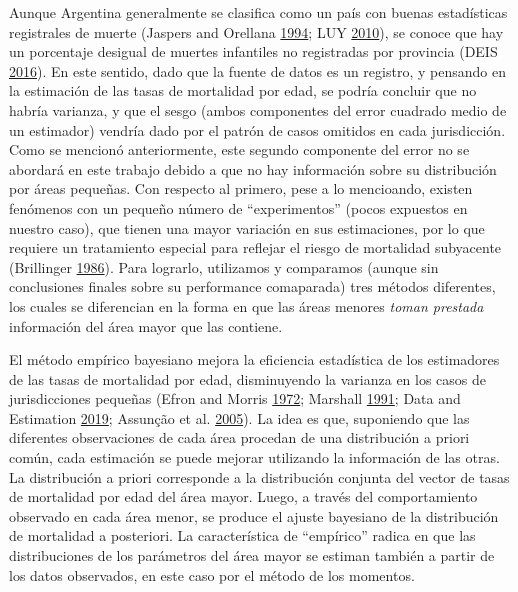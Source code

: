 \documentclass[12pt,]{article}
\begin{document}
Aunque Argentina generalmente se clasifica como un país con buenas
estadísticas registrales de muerte (Jaspers and Orellana
\protect\hyperlink{ref-JaspersOrellana1994}{1994}; LUY
\protect\hyperlink{ref-Luy2010}{2010}), se conoce que hay un porcentaje
desigual de muertes infantiles no registradas por provincia (DEIS
\protect\hyperlink{ref-DEIS2016}{2016}). En este sentido, dado que la
fuente de datos es un registro, y pensando en la estimación de las tasas
de mortalidad por edad, se podría concluir que no habría varianza, y que
el sesgo (ambos componentes del error cuadrado medio de un estimador)
vendría dado por el patrón de casos omitidos en cada jurisdicción. Como
se mencionó anteriormente, este segundo componente del error no se
abordará en este trabajo debido a que no hay información sobre su
distribución por áreas pequeñas. Con respecto al primero, pese a lo
mencioando, existen fenómenos con un pequeño número de ``experimentos''
(pocos expuestos en nuestro caso), que tienen una mayor variación en sus
estimaciones, por lo que requiere un tratamiento especial para reflejar
el riesgo de mortalidad subyacente (Brillinger
\protect\hyperlink{ref-Brillinger1986}{1986}). Para lograrlo, utilizamos
y comparamos (aunque sin conclusiones finales sobre su performance
comaparada) tres métodos diferentes, los cuales se diferencian en la
forma en que las áreas menores \emph{toman prestada} información del
área mayor que las contiene.

El método empírico bayesiano mejora la eficiencia estadística de los
estimadores de las tasas de mortalidad por edad, disminuyendo la
varianza en los casos de jurisdicciones pequeñas (Efron and Morris
\protect\hyperlink{ref-Efron1972}{1972}; Marshall
\protect\hyperlink{ref-Marshall1991}{1991}; Data and Estimation
\protect\hyperlink{ref-Longford2005}{2019}; Assunção et al.
\protect\hyperlink{ref-Assuncao2005}{2005}). La idea es que, suponiendo
que las diferentes observaciones de cada área procedan de una
distribución a priori común, cada estimación se puede mejorar utilizando
la información de las otras. La distribución a priori corresponde a la
distribución conjunta del vector de tasas de mortalidad por edad del
área mayor. Luego, a través del comportamiento observado en cada área
menor, se produce el ajuste bayesiano de la distribución de mortalidad a
posteriori. La característica de ``empírico'' radica en que las
distribuciones de los parámetros del área mayor se estiman también a
partir de los datos observados, en este caso por el método de los
momentos.
\end{document}
